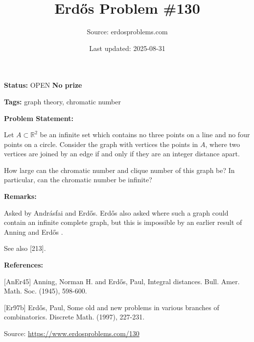 \documentclass{article}
\title{Erd\H{o}s Problem \#130}
\date{Last updated: 2025-08-31}
\author{Source: erdosproblems.com}
\begin{document}
\maketitle

\noindent\textbf{Status:} OPEN \quad \textbf{No prize}

\noindent\textbf{Tags:} graph theory, chromatic number

\medskip
\noindent\textbf{Problem Statement:}

Let $A\subset\mathbb{R}^2$ be an infinite set which contains no three points on a line and no four points on a circle. Consider the graph with vertices the points in $A$, where two vertices are joined by an edge if and only if they are an integer distance apart. 

How large can the chromatic number and clique number of this graph be? In particular, can the chromatic number be infinite?

\bigskip
\noindent\textbf{Remarks:}

Asked by Andr\'{a}sfai and Erd\H{o}s. Erd\H{o}s \cite{Er97b} also asked where such a graph could contain an infinite complete graph, but this is impossible by an earlier result of Anning and Erd\H{o}s \cite{AnEr45}.

See also [213].

\bigskip
\noindent\textbf{References:}

[AnEr45] Anning, Norman H. and Erd\H{o}s, Paul, Integral distances. Bull. Amer. Math. Soc. (1945), 598-600.
 
 [Er97b] Erd\H{o}s, Paul, Some old and new problems in various branches of combinatorics. Discrete Math. (1997), 227-231.

\bigskip
\noindent\small{Source: \url{https://www.erdosproblems.com/130}}
\end{document}
